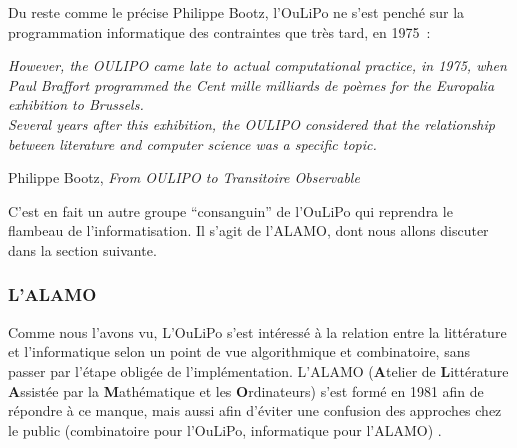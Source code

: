 \documentclass{article}
\newenvironment{citationbox}
{\begin{center}
		\begin{minipage}{.8\textwidth}
		}
		{
		\end{minipage}	
\end{center}
}
\begin{document}
					Du reste comme le précise Philippe Bootz, l'OuLiPo ne s'est penché sur la programmation informatique des contraintes que très tard, en 1975~:
					\begin{citationbox}
						\textit{However, the OULIPO came late to actual computational practice, in 1975, when Paul Braffort programmed the Cent mille milliards de poèmes for the Europalia exhibition to Brussels.\\
						Several years after this exhibition, the OULIPO considered that the relationship between literature and computer science was a specific topic.}
						\begin{flushright}
							Philippe Bootz, \textit{From OULIPO to Transitoire Observable} \cite{bootz2012}
						\end{flushright}
					\end{citationbox}
					C'est en fait un autre groupe ``consanguin'' de l'OuLiPo qui reprendra le flambeau de l'informatisation. Il s'agit de l'ALAMO, dont nous allons discuter dans la section suivante.
				
				
				
			\subsubsection{L'ALAMO}
				Comme nous l'avons vu, L'OuLiPo s'est intéressé à la relation entre la littérature et l'informatique selon un point de vue algorithmique et combinatoire, sans passer par l'étape obligée de l'implémentation. L'ALAMO (\textbf{A}telier de \textbf{L}ittérature \textbf{A}ssistée par la \textbf{M}athématique et les \textbf{O}rdinateurs) s'est formé en 1981 afin de répondre à ce manque, mais aussi afin d'éviter une confusion des approches chez le public (combinatoire pour l'OuLiPo, informatique pour l'ALAMO) \cite{alamo}.\\
				
\end{document}
